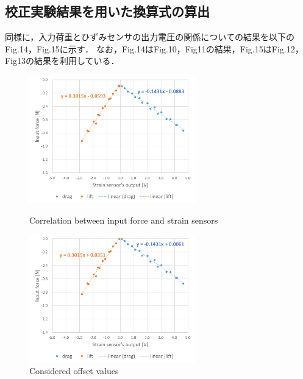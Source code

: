 \documentclass[twocolumn,a4j]{jsarticle}
\begin{document}
\subsection{校正実験結果を用いた換算式の算出}
同様に，入力荷重とひずみセンサの出力電圧の関係についての結果を以下のFig.14，Fig.15に示す．
なお，Fig.14はFig.10，Fig11の結果，Fig.15はFig.12，Fig13の結果を利用している．
\begin{figure}[htbp]
    \footnotesize
    \begin{center}
        \includegraphics[width=72mm]{../images/convert.png}
        \caption{Correlation between input force and strain sensors}
        \includegraphics[width=72mm]{../images/convert_offset.png}
        \caption{Considered offset values}
    \end{center}
\end{figure}
\end{document}

